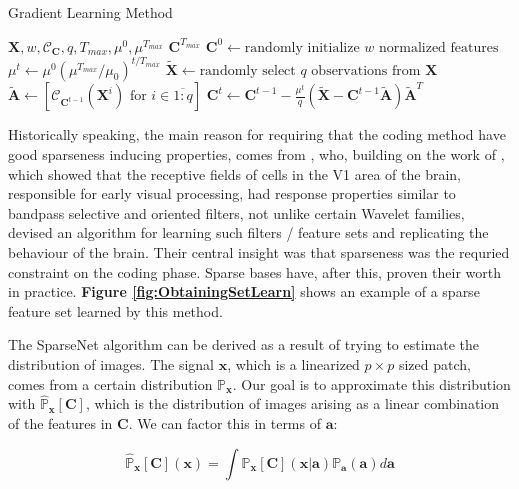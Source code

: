 \documentclass[12pt,a4paper,oneside,english]{UPBThesis}
\newcommand{\hctimes}[2]{{#1}\!\times\!{#2}}
\newcommand{\hcrange}[2]{\overline{{#1}\colon\!\!{#2}}}
\begin{document}
\begin{algorithm}
\caption{Gradient Learning Method}
\label{algo:GradSt}
\begin{algorithmic}
\Require $\textbf{X},w,\mathcal{C}_\textbf{C},q,T_{max},\mu^0,\mu^{T_{max}}$
\Ensure $\textbf{C}^{T_{max}}$
\State $\textbf{C}^0 \gets \mbox{randomly initialize $w$ normalized features}$
\For {$t = \hcrange{1}{T_{max}}$}
\State $\mu^t \gets \mu^0(\mu^{T_{max}} / \mu_0)^{t / T_{max}}$ 
\State $\tilde{\textbf{X}} \gets \mbox{randomly select $q$ observations from $\textbf{X}$}$
\State $\tilde{\textbf{A}} \gets \left[ \mathcal{C}_{\textbf{C}^{t-1}}(\textbf{X}^i) \mbox{~for $i \in \hcrange{1}{q}$} \right]$
\State $\textbf{C}^t \gets \textbf{C}^{t-1} - \frac{\mu^t}{q} \left( \tilde{\textbf{X}} - \textbf{C}^{t-1}\tilde{\textbf{A}} \right) \tilde{\textbf{A}}^T$
\EndFor
\end{algorithmic}
\end{algorithm}

Historically speaking, the main reason for requiring that the coding method have good sparseness inducing properties, comes from \cite{emergence-sparse-coding,sparse-coding-strategy-V1}, who, building on the work of \cite{macaque-cortex}, which showed that the receptive fields of cells in the V1 area of the brain, responsible for early visual processing, had response properties similar to bandpass selective and oriented filters, not unlike certain Wavelet families, devised an algorithm for learning such filters / feature sets and replicating the behaviour of the brain. Their central insight was that sparseness was the requried constraint on the coding phase. Sparse bases have, after this, proven their worth in practice. \textbf{Figure \ref{fig:ObtainingSetLearn}} shows an example of a sparse feature set learned by this method.

The SparseNet algorithm can be derived as a result of trying to estimate the distribution of images. The signal $\textbf{x}$, which is a linearized $\hctimes{p}{p}$ sized patch, comes from a certain distribution $\mathbb{P}_\textbf{x}$. Our goal is to approximate this distribution with $\hat{\mathbb{P}}_\textbf{x}[\textbf{C}]$, which is the distribution of images arising as a linear combination of the features in $\textbf{C}$. We can factor this in terms of $\textbf{a}$:

\begin{equation*}
\hat{\mathbb{P}}_\textbf{x}[\textbf{C}](\textbf{x}) = \int{ \mathbb{P}_\textbf{x}[\textbf{C}](\textbf{x}\left|\right.\textbf{a}) \mathbb{P}_\textbf{a}(\textbf{a}) d\textbf{a}}
\end{equation*}
\end{document}
